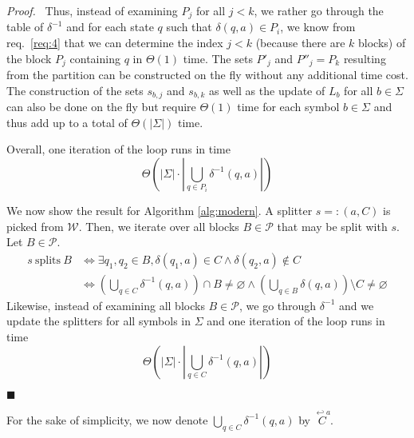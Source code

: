 \documentclass[12pt, a4 paper]{article}
\renewenvironment{proof}[1][Proof]{\begin{mdframed}[backgroundcolor=black!5, topline=false, rightline=false, bottomline=false, linecolor=black!15, linewidth=3pt]{\noindent\textit{#1.}\ }}{\noindent\par\hfill$\blacksquare$\end{mdframed}}
\theoremstyle{definition}
\begin{document}
\begin{proof}
    Thus, instead of examining $P_j$ for all $j < k$, we rather go through the table of $\delta^{-1}$ and for each state $q$ such that $\delta(q, a) \in P_i$, we know from req.\ \ref{req:4} that we can determine the index $j < k$ (because there are $k$ blocks) of the block $P_j$ containing $q$ in $\Theta(1)$ time.
    The sets $P'_j$ and $P''_j = P_k$ resulting from the partition can be constructed on the fly without any additional time cost. The construction of the sets $s_{b, j}$ and $s_{b, k}$ as well as the update of $L_b$ for all $b \in \Sigma$ can also be done on the fly but require $\Theta(1)$ time for each symbol $b \in \Sigma$ and thus add up to a total of $\Theta(\left| \Sigma \right|)$ time.

    Overall, one iteration of the loop runs in time
    $$\Theta \left( \left| \Sigma \right| \cdot \left| \bigcup_{q \in P_i} \delta^{-1}(q, a) \right| \right) $$

    \bigskip
    We now show the result for Algorithm \ref{alg:modern}. A splitter ${s =: (a, C)}$ is picked from $\mathcal{W}$.
    Then, we iterate over all blocks $B \in \mathcal{P}$ that may be split with $s$. Let $B \in \mathcal{P}$.
    \begin{align*}
        s\ \text{splits}\ B &\iff \exists q_1, q_2 \in B, \delta(q_1, a) \in C \land \delta(q_2, a) \notin C\\
        &\iff \left(\bigcup_{q \in C} \delta^{-1}(q, a)\right)\cap B \neq \varnothing \land \left(\bigcup_{q \in B}\delta(q, a)\right)\setminus C \neq \varnothing
    \end{align*}
    Likewise, instead of examining all blocks $B \in \mathcal{P}$, we go through $\delta^{-1}$ and we update the splitters for all symbols in $\Sigma$ and one iteration of the loop runs in time
    $$\Theta \left( \left| \Sigma \right| \cdot \left| \bigcup_{q \in C} \delta^{-1}(q, a) \right| \right) $$
\end{proof}

\newcommand{\preds}[2]{\ensuremath{\overset{\hookleftarrow {#1}}{#2}}}

For the sake of simplicity, we now denote $\displaystyle{\bigcup_{q \in C} \delta^{-1}(q, a)}$ by $\preds{a}{C}$.
\end{document}
